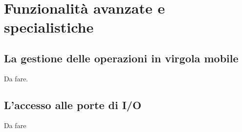 









\section{Funzionalità avanzate e specialistiche}
\label{sec:process_special}





\subsection{La gestione delle operazioni in virgola mobile}
\label{sec:process_fenv}

Da fare.



\subsection{L'accesso alle porte di I/O}
\label{sec:process_io_port}

%

Da fare



